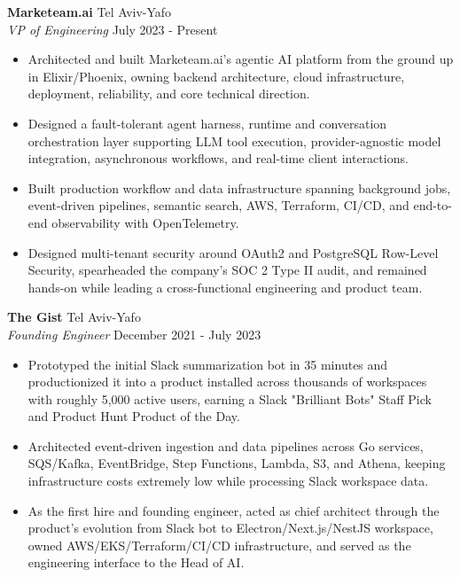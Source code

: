 \documentclass[a4paper]{article}
\begin{document}
\textbf{Marketeam.ai} \hfill Tel Aviv-Yafo\\
\textit{VP of Engineering} \hfill July 2023 - Present\\
\vspace{-1mm}
\begin{itemize} \itemsep 1pt
	\item Architected and built Marketeam.ai's agentic AI platform from the ground up in Elixir/Phoenix, owning backend architecture, cloud infrastructure, deployment, reliability, and core technical direction.
	\item Designed a fault-tolerant agent harness, runtime and conversation orchestration layer supporting LLM tool execution, provider-agnostic model integration, asynchronous workflows, and real-time client interactions.
	\item Built production workflow and data infrastructure spanning background jobs, event-driven pipelines, semantic search, AWS, Terraform, CI/CD, and end-to-end observability with OpenTelemetry.
	\item Designed multi-tenant security around OAuth2 and PostgreSQL Row-Level Security, spearheaded the company's SOC 2 Type II audit, and remained hands-on while leading a cross-functional engineering and product team.
\end{itemize}
\textbf{The Gist} \hfill Tel Aviv-Yafo\\
\textit{Founding Engineer} \hfill December 2021 - July 2023\\
\vspace{-1mm}
\begin{itemize} \itemsep 1pt
	\item Prototyped the initial Slack summarization bot in 35 minutes and productionized it into a product installed across thousands of workspaces with roughly 5,000 active users, earning a Slack "Brilliant Bots" Staff Pick and Product Hunt Product of the Day.
	\item Architected event-driven ingestion and data pipelines across Go services, SQS/Kafka, EventBridge, Step Functions, Lambda, S3, and Athena, keeping infrastructure costs extremely low while processing Slack workspace data.
	\item As the first hire and founding engineer, acted as chief architect through the product's evolution from Slack bot to Electron/Next.js/NestJS workspace, owned AWS/EKS/Terraform/CI/CD infrastructure, and served as the engineering interface to the Head of AI.
\end{itemize}
\end{document}
